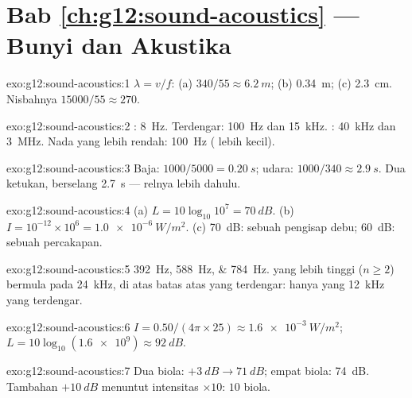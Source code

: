 \section*{Bab \ref{ch:g12:sound-acoustics} --- Bunyi dan Akustika}

\begin{solution}{exo:g12:sound-acoustics:1}
$\lambda = v/f$: (a) $340/55 \approx \qty{6.2}{m}$; (b)
\qty{0.34}{m}; (c) \qty{2.3}{cm}. Nisbahnya $15000/55 \approx 270$.
\end{solution}

\begin{solution}{exo:g12:sound-acoustics:2}
: \qty{8}{Hz}. Terdengar: \qty{100}{Hz} dan \qty{15}{kHz}.
: \qty{40}{kHz} dan \qty{3}{MHz}. Nada yang lebih rendah:
\qty{100}{Hz} ( lebih kecil).
\end{solution}

\begin{solution}{exo:g12:sound-acoustics:3}
Baja: $1000/5000 = \qty{0.20}{s}$; udara:
$1000/340 \approx
\qty{2.9}{s}$. Dua ketukan, berselang \qty{2.7}{s}
--- relnya lebih dahulu.
\end{solution}

\begin{solution}{exo:g12:sound-acoustics:4}
(a) $L = 10\log_{10}10^{7} = \qty{70}{dB}$. (b) $I = 10^{-12} \times
10^{6} = \qty{1.0e-6}{W/m^2}$. (c) \qty{70}{dB}: sebuah pengisap debu;
\qty{60}{dB}: sebuah percakapan.
\end{solution}

\begin{solution}{exo:g12:sound-acoustics:5}
\qtylist{392;588;784}{Hz}.  yang lebih tinggi ($n \ge 2$)
bermula pada \qty{24}{kHz}, di atas batas atas yang terdengar: hanya
 yang \qty{12}{kHz} yang terdengar.
\end{solution}

\begin{solution}{exo:g12:sound-acoustics:6}
$I = 0.50/(4\pi \times 25) \approx \qty{1.6e-3}{W/m^2}$;
$L = 10\log_{10}(\num{1.6e9}) \approx \qty{92}{dB}$.
\end{solution}

\begin{solution}{exo:g12:sound-acoustics:7}
Dua biola: $+\qty{3}{dB} \to \qty{71}{dB}$; empat biola: \qty{74}{dB}.
Tambahan $+\qty{10}{dB}$ menuntut intensitas $\times 10$: $10$ biola.
\end{solution}

